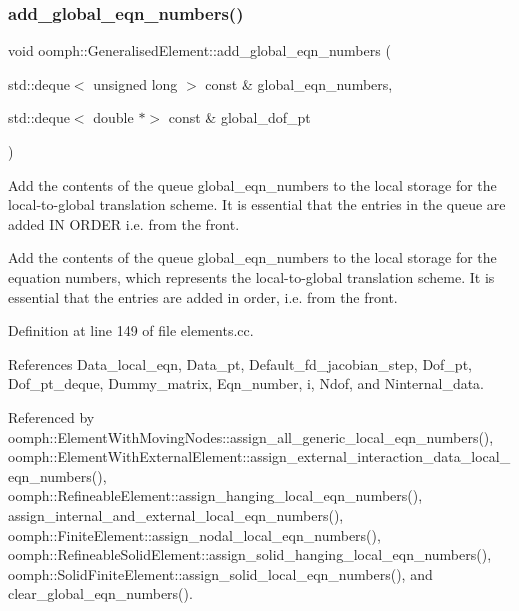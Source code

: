 \subsubsection{\texorpdfstring{add\+\_\+global\+\_\+eqn\+\_\+numbers()}{add\_global\_eqn\_numbers()}}
{\footnotesize\ttfamily void oomph\+::\+Generalised\+Element\+::add\+\_\+global\+\_\+eqn\+\_\+numbers (\begin{DoxyParamCaption}\item[{std\+::deque$<$ unsigned long $>$ const \&}]{global\+\_\+eqn\+\_\+numbers,  }\item[{std\+::deque$<$ double $\ast$$>$ const \&}]{global\+\_\+dof\+\_\+pt }\end{DoxyParamCaption})\hspace{0.3cm}{\ttfamily [protected]}}



Add the contents of the queue global\+\_\+eqn\+\_\+numbers to the local storage for the local-\/to-\/global translation scheme. It is essential that the entries in the queue are added IN O\+R\+D\+ER i.\+e. from the front. 

Add the contents of the queue global\+\_\+eqn\+\_\+numbers to the local storage for the equation numbers, which represents the local-\/to-\/global translation scheme. It is essential that the entries are added in order, i.\+e. from the front. 

Definition at line 149 of file elements.\+cc.



References Data\+\_\+local\+\_\+eqn, Data\+\_\+pt, Default\+\_\+fd\+\_\+jacobian\+\_\+step, Dof\+\_\+pt, Dof\+\_\+pt\+\_\+deque, Dummy\+\_\+matrix, Eqn\+\_\+number, i, Ndof, and Ninternal\+\_\+data.



Referenced by oomph\+::\+Element\+With\+Moving\+Nodes\+::assign\+\_\+all\+\_\+generic\+\_\+local\+\_\+eqn\+\_\+numbers(), oomph\+::\+Element\+With\+External\+Element\+::assign\+\_\+external\+\_\+interaction\+\_\+data\+\_\+local\+\_\+eqn\+\_\+numbers(), oomph\+::\+Refineable\+Element\+::assign\+\_\+hanging\+\_\+local\+\_\+eqn\+\_\+numbers(), assign\+\_\+internal\+\_\+and\+\_\+external\+\_\+local\+\_\+eqn\+\_\+numbers(), oomph\+::\+Finite\+Element\+::assign\+\_\+nodal\+\_\+local\+\_\+eqn\+\_\+numbers(), oomph\+::\+Refineable\+Solid\+Element\+::assign\+\_\+solid\+\_\+hanging\+\_\+local\+\_\+eqn\+\_\+numbers(), oomph\+::\+Solid\+Finite\+Element\+::assign\+\_\+solid\+\_\+local\+\_\+eqn\+\_\+numbers(), and clear\+\_\+global\+\_\+eqn\+\_\+numbers().

